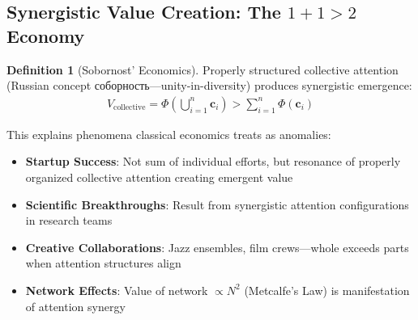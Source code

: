\documentclass[11pt,a4paper]{article}
\theoremstyle{definition}
\newtheorem{definition}{Definition}[section]
\theoremstyle{remark}
\newcommand{\cc}{\mathbf{c}}
\begin{document}
\subsection{Synergistic Value Creation: The \(1+1>2\) Economy}

\begin{definition}[Sobornost' Economics]
Properly structured collective attention (Russian concept соборность—unity-in-diversity) produces synergistic emergence:
\begin{align}
V_{\text{collective}} = \Phi\left(\bigcup_{i=1}^n \cc_i\right) > \sum_{i=1}^n \Phi(\cc_i)
\end{align}

This explains phenomena classical economics treats as anomalies:
\begin{itemize}
\item \textbf{Startup Success}: Not sum of individual efforts, but resonance of properly organized collective attention creating emergent value
\item \textbf{Scientific Breakthroughs}: Result from synergistic attention configurations in research teams
\item \textbf{Creative Collaborations}: Jazz ensembles, film crews—whole exceeds parts when attention structures align
\item \textbf{Network Effects}: Value of network \(\propto N^2\) (Metcalfe's Law) is manifestation of attention synergy
\end{itemize}
\end{definition}
\end{document}
